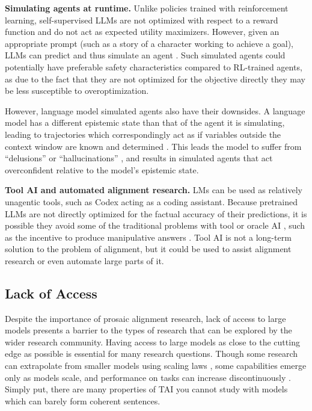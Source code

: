 \documentclass{article}
\begin{document}

\textbf{Simulating agents at runtime.} Unlike policies trained with reinforcement learning, self-supervised LLMs are not optimized with respect to a reward function and do not act as expected utility maximizers. However, given an appropriate prompt (such as a story of a character working to achieve a goal), LLMs can predict and thus simulate an agent \citep{huang2022language}. Such simulated agents could potentially have preferable safety characteristics compared to RL-trained agents, as due to the fact that they are not optimized for the objective directly they may be less susceptible to overoptimization. 

However, language model simulated agents also have their downsides. A language model has a different epistemic state than that of the agent it is simulating, leading to trajectories which correspondingly act as if variables outside the context window are known and determined \citep{shaking-the-foundation,bc-miscalibrated}. This leads the model to suffer from “delusions” or “hallucinations” \citep{Shuster2021RetrievalAR,liu2021tokenlevel,Maynez2020OnFA}, and results in simulated agents that act overconfident relative to the model's epistemic state.

\textbf{Tool AI and automated alignment research.} LMs can be used as relatively unagentic tools, such as Codex \citep{chen2021evaluating} acting as a coding assistant. Because pretrained LLMs are not directly optimized for the factual accuracy of their predictions, it is possible they avoid some of the traditional problems with tool or oracle AI \citep{Armstrong2012ThinkingIT}, such as the incentive to produce manipulative answers \citep{predictomatic}. Tool AI is not a long-term solution to the problem of alignment, but it could be used to assist alignment research or even automate large parts of it.


\subsection{Lack of Access}

Despite the importance of prosaic alignment research, lack of access to large models presents a barrier to the types of research that can be explored by the wider research community. Having access to large models as close to the cutting edge as possible is essential for many research questions. Though some research can extrapolate from smaller models using scaling laws \citep{kaplan2020scaling}, some capabilities emerge only as models scale, and performance on tasks can increase discontinuously \citep{brown2020language}. Simply put, there are many properties of TAI you cannot study with models which can barely form coherent sentences.
\end{document}
